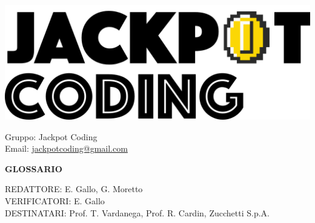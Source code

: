 \documentclass[5pt]{article}
\begin{document}
\begin{minipage}[t]{0.50\textwidth}
    \begin{flushleft}
        \hspace{10pt}
        \includegraphics[scale=0.65]{jackpot-logo.png} 
    \end{flushleft}
\end{minipage}
\hspace{-60pt} %
\begin{flushright}
    \begin{minipage}[t]{0.50\textwidth}
        \begin{flushright}
            Gruppo: {\Large Jackpot Coding}\\
            Email: \href{mailto:jackpotcoding@gmail.com}{jackpotcoding@gmail.com}
        \end{flushright}
    \end{minipage}
\end{flushright}

\vspace{24pt}

\begin{center}
    \textbf{\LARGE GLOSSARIO}
\end{center}

\vspace{13pt}

\begin{flushleft}
    \begin{spacing}{1.5}
        REDATTORE: E. Gallo, G. Moretto\\%
        VERIFICATORI: E. Gallo \\
        \vspace{7pt}
        DESTINATARI: Prof. T. Vardanega, Prof. R. Cardin, Zucchetti S.p.A.\\%
    \end{spacing}
\end{flushleft}
\end{document}
